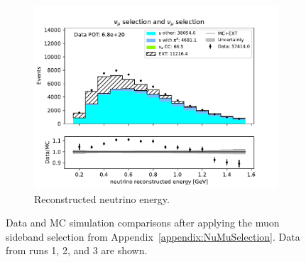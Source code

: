 \begin{figure}[H]
\begin{subfigure}{0.33\linewidth}
        \includegraphics[width=\linewidth]{technote/Sidebands/Figures/NuMuSideband/muon_sideband_neutrino_energy_run123_NUMU_NUMU.pdf}
        \caption{Reconstructed neutrino energy.}
    \end{subfigure}
    \caption{Data and MC simulation comparisons after applying the muon sideband selection from Appendix~\ref{appendix:NuMuSelection}. Data from runs 1, 2, and 3 are shown.}
\end{figure}

